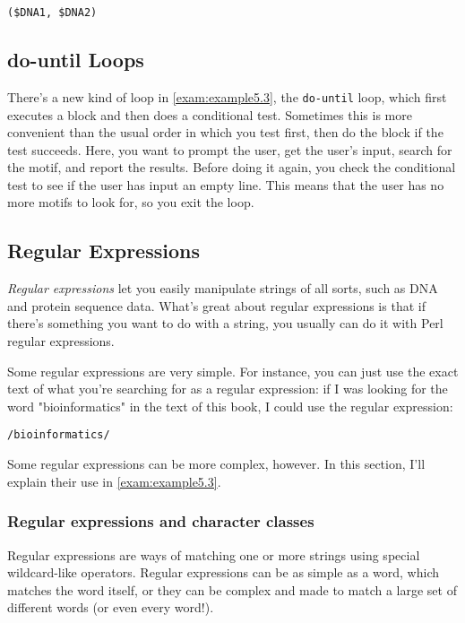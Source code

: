 \begin{lstlisting}
($DNA1, $DNA2)
\end{lstlisting}

\subsection{do-until Loops}
There's a new kind of loop in \autoref{exam:example5.3}, the \verb|do-until| loop, which first executes a block and then does a conditional test. Sometimes this is more convenient than the usual order in which you test first, then do the block if the test succeeds. Here, you want to prompt the user, get the user's input, search for the motif, and report the results. Before doing it again, you check the conditional test to see if the user has input an empty line. This means that the user has no more motifs to look for, so you exit the loop. 

\subsection{Regular Expressions}
\textit{Regular expressions} let you easily manipulate strings of all sorts, such as DNA and protein sequence data. What's great about regular expressions is that if there's something you want to do with a string, you usually can do it with Perl regular expressions.

Some regular expressions are very simple. For instance, you can just use the exact text of what you're searching for as a regular expression: if I was looking for the word "bioinformatics" in the text of this book, I could use the regular expression:

\begin{lstlisting}
/bioinformatics/
\end{lstlisting}

Some regular expressions can be more complex, however. In this section, I'll explain their use in \autoref{exam:example5.3}. 

\subsubsection{Regular expressions and character classes}
Regular expressions are ways of matching one or more strings using special wildcard-like operators. Regular expressions can be as simple as a word, which matches the word itself, or they can be complex and made to match a large set of different words (or even every word!).

